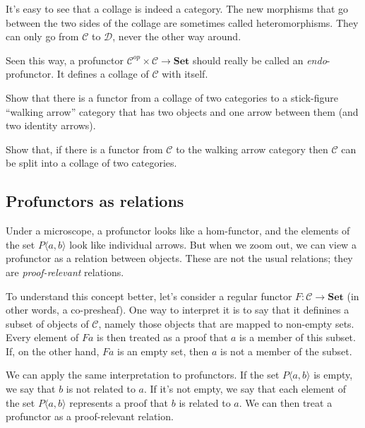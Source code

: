 \documentclass[DaoFP]{subfiles}
\begin{document}
It's easy to see that a collage is indeed a category. The new morphisms that go between the two sides of the collage are sometimes called heteromorphisms. They can only go from $\mathcal{C}$ to $\mathcal{D}$, never the other way around. 

Seen this way, a profunctor $ \mathcal{C}^{op} \times  \mathcal{C} \to \mathbf{Set}$ should really be called an \emph{endo}-profunctor. It defines a collage of $\mathcal{C}$ with itself.

\begin{exercise}
Show that there is a functor from a collage of two categories to a stick-figure ``walking arrow'' category that has two objects and one arrow between them (and two identity arrows).
\end{exercise}
\begin{exercise}
Show that, if there is a functor from $\mathcal{C}$ to the walking arrow category then $\mathcal{C}$ can be split into a collage of two categories. 
\end{exercise}

\subsection{Profunctors as relations}

Under a microscope, a profunctor looks like a hom-functor, and the elements of the set $P \langle a, b \rangle$ look like individual arrows. But when we zoom out, we can view a profunctor as a relation between objects. These are not the usual relations; they are \emph{proof-relevant} relations.

To understand this concept better, let's consider a regular functor $F \colon \mathcal{C} \to \mathbf{Set}$ (in other words, a co-presheaf). One way to interpret it is to say that it definines a  subset of objects of $\mathcal{C}$, namely those objects that are mapped to non-empty sets. Every element of $F a$ is then treated as a proof that $a$ is a member of this subset. If, on the other hand, $F a$ is an empty set, then $a$ is not a member of the subset.

We can apply the same interpretation to profunctors. If the set $P \langle a, b \rangle$ is empty, we say that $b$ is not related to $a$. If it's not empty, we say that each element of the set $P \langle a, b \rangle$ represents a proof that $b$ is related to $a$. We can then treat a profunctor as a proof-relevant relation. 
\end{document}
